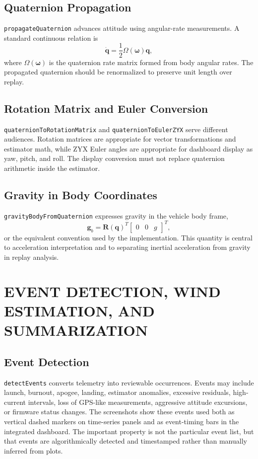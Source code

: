 \documentclass[colorlinks,upint,subscriptcorrection,varvw,hyphenate,balance]{asmeconf}
\newcommand{\code}[1]{\texttt{\allowbreak#1}}
\newcommand{\R}{\mathbf{R}}
\newcommand{\q}{\mathbf{q}}
\newcommand{\gvec}{\mathbf{g}}
\newcommand{\wvec}{\boldsymbol{\omega}}
\begin{document}
\subsection{Quaternion Propagation}
\code{propagateQuaternion} advances attitude using angular-rate measurements. A standard continuous relation is
\begin{equation}
\dot{\q} = \frac{1}{2}\Omega(\wvec)\q,
\label{eq:quat_prop}
\end{equation}
where $\Omega(\wvec)$ is the quaternion rate matrix formed from body angular rates. The propagated quaternion should be renormalized to preserve unit length over replay.

\subsection{Rotation Matrix and Euler Conversion}
\code{quaternionToRotationMatrix} and \code{quaternionToEulerZYX} serve different audiences. Rotation matrices are appropriate for vector transformations and estimator math, while ZYX Euler angles are appropriate for dashboard display as yaw, pitch, and roll. The display conversion must not replace quaternion arithmetic inside the estimator.

\subsection{Gravity in Body Coordinates}
\code{gravityBodyFromQuaternion} expresses gravity in the vehicle body frame,
\begin{equation}
\gvec_b = \R(\q)^T
\begin{bmatrix}
0 & 0 & g
\end{bmatrix}^T,
\label{eq:gravity_body}
\end{equation}
or the equivalent convention used by the implementation. This quantity is central to acceleration interpretation and to separating inertial acceleration from gravity in replay analysis.

\section{EVENT DETECTION, WIND ESTIMATION, AND SUMMARIZATION}

\subsection{Event Detection}
\code{detectEvents} converts telemetry into reviewable occurrences. Events may include launch, burnout, apogee, landing, estimator anomalies, excessive residuals, high-current intervals, loss of GPS-like measurements, aggressive attitude excursions, or firmware status changes. The screenshots show these events used both as vertical dashed markers on time-series panels and as event-timing bars in the integrated dashboard. The important property is not the particular event list, but that events are algorithmically detected and timestamped rather than manually inferred from plots.
\end{document}
